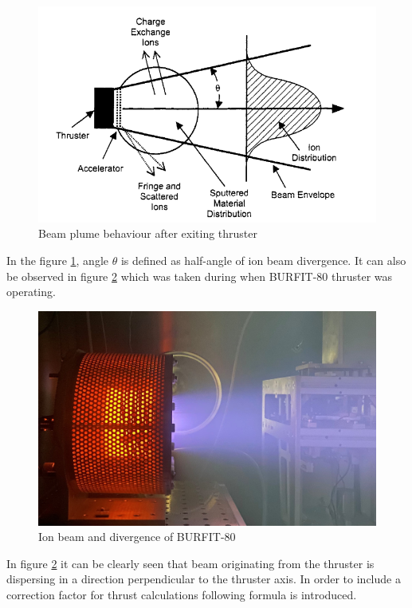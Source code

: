 \begin{figure}[ht]
    \centering
    \includegraphics[scale=.75]{fig/beamdivergence.png}
    \caption[Beam plume behaviour after exiting thruster]{Beam plume behaviour after exiting thruster\cite{goebel2008fundamentals}}
    \label{fig:beamdivergence}
\end{figure}

In the figure \ref{fig:beamdivergence}, angle $\theta$ is defined as half-angle of ion beam divergence. It can also be observed in figure \ref{fig:beamdivergence2} which was taken during when BURFIT-80 thruster was operating. 

\begin{figure}[ht]
    \centering
\includegraphics[scale=0.15]{fig/beamdiv.jpg}
\caption{Ion beam and divergence of BURFIT-80}
\label{fig:beamdivergence2}
\end{figure}

In figure \ref{fig:beamdivergence2} it can be clearly seen that beam originating from the thruster is dispersing in a direction perpendicular to the thruster axis. In order to include a correction factor for thrust calculations following formula is introduced. 

